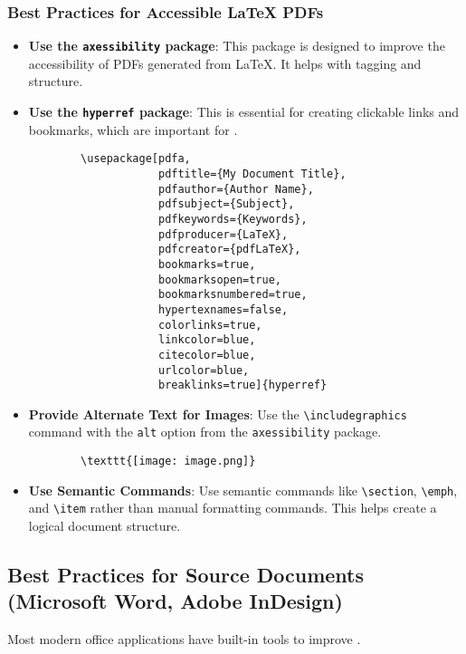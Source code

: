 \subsubsection{Best Practices for Accessible LaTeX PDFs}
\label{ssubsec:accessible-latex-pdfs}
\begin{itemize}
	\item \textbf{Use the \texttt{axessibility} package}: This package is designed to improve the accessibility of PDFs generated from LaTeX. It helps with tagging and structure.
	\item \textbf{Use the \texttt{hyperref} package}: This is essential for creating clickable links and bookmarks, which are important for .
	      \begin{verbatim}
        \usepackage[pdfa,
                    pdftitle={My Document Title},
                    pdfauthor={Author Name},
                    pdfsubject={Subject},
                    pdfkeywords={Keywords},
                    pdfproducer={LaTeX},
                    pdfcreator={pdfLaTeX},
                    bookmarks=true,
                    bookmarksopen=true,
                    bookmarksnumbered=true,
                    hypertexnames=false,
                    colorlinks=true,
                    linkcolor=blue,
                    citecolor=blue,
                    urlcolor=blue,
                    breaklinks=true]{hyperref}
    \end{verbatim}
	\item \textbf{Provide Alternate Text for Images}: Use the \texttt{\textbackslash includegraphics} command with the \texttt{alt} option from the \texttt{axessibility} package.
	      \begin{verbatim}
        \texttt{[image: image.png]}
    \end{verbatim}
	\item \textbf{Use Semantic Commands}: Use semantic commands like \texttt{\textbackslash section}, \texttt{\textbackslash emph}, and \texttt{\textbackslash item} rather than manual formatting commands. This helps create a logical document structure.
\end{itemize}

\subsection{Best Practices for Source Documents (Microsoft Word, Adobe InDesign)}
\label{subsec:best-practices-source-docs}
Most modern office applications have built-in tools to improve .

